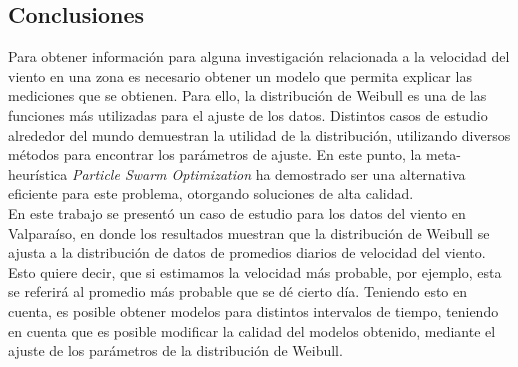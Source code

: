 \subsection{Conclusiones}
Para obtener información para alguna investigación relacionada a la velocidad del viento en una zona es necesario obtener un modelo que permita explicar las mediciones que se obtienen. Para ello, la distribución de Weibull es una de las funciones más utilizadas para el ajuste de los datos.
Distintos casos de estudio alrededor del mundo demuestran la utilidad de la distribución, utilizando diversos métodos para encontrar los parámetros de ajuste.
En este punto, la meta-heurística \emph{Particle Swarm Optimization} ha demostrado ser una alternativa eficiente para este problema, otorgando soluciones 
de alta calidad.\\
En este trabajo se presentó un caso de estudio para los datos del viento en Valparaíso, en donde los resultados muestran que la distribución de Weibull
se ajusta a la distribución de datos de promedios diarios de velocidad del viento. Esto quiere decir, que si estimamos la velocidad más probable, por ejemplo, 
esta se referirá al promedio más probable que se dé cierto día. Teniendo esto en cuenta, es posible obtener modelos para distintos intervalos de tiempo,
teniendo en cuenta que es posible modificar la calidad del modelos obtenido, mediante el ajuste de los parámetros de la distribución de Weibull.